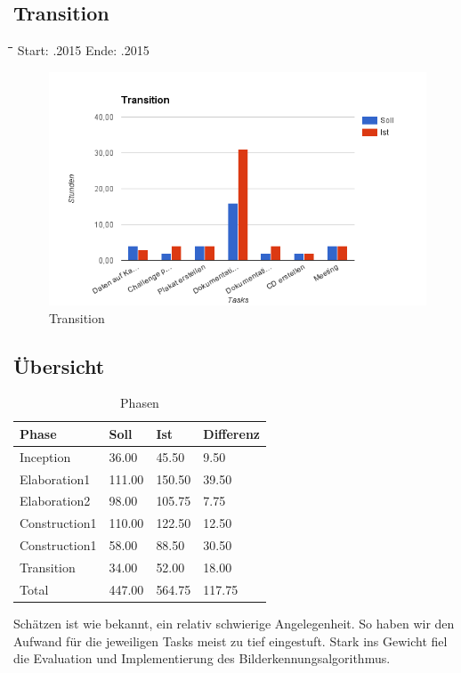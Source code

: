 \subsection{Transition}
\begin{tabbing}[H]
    \hspace*{3cm}\=\hspace*{5cm}\=\hspace*{3cm}\=\hspace*{3cm}\= \kill
    Start: .2015 \> Ende: .2015 \\
\end{tabbing}
\begin{figure}[H]
\centering
\includegraphics[width=390pt]{images/transition.png}
\caption[Transition]{Transition}
\end{figure}

\subsection{Übersicht}
\begin{table}[H]
\centering
    \begin{tabular}{|p{5cm}|p{2cm}|p{2cm}|p{2cm}|}
    \hline    
    \rowcolor{lightblue}
	Phase & Soll & Ist & Differenz \\ \hline
	Inception & 36.00 &	45.50 &	9.50 \\ \hline
	Elaboration1 & 111.00 & 150.50	& 39.50 \\ \hline
	Elaboration2 & 98.00 & 105.75 & 7.75 \\ \hline
	Construction1 & 110.00 & 122.50 & 12.50 \\ \hline
	Construction1 & 58.00 & 88.50 & 30.50 \\ \hline
	Transition & 34.00 & 52.00 & 18.00 \\ \hline
	\rowcolor{lightblue}
	Total & 447.00 & 564.75 & 117.75 \\ \hline
    \end{tabular}
    \caption[Phasen]{Phasen}
\end{table}

Schätzen ist wie bekannt, ein relativ schwierige Angelegenheit. So haben wir den Aufwand für die jeweiligen Tasks meist zu tief eingestuft. Stark ins Gewicht fiel die Evaluation und Implementierung des Bilderkennungsalgorithmus.

\newpage
